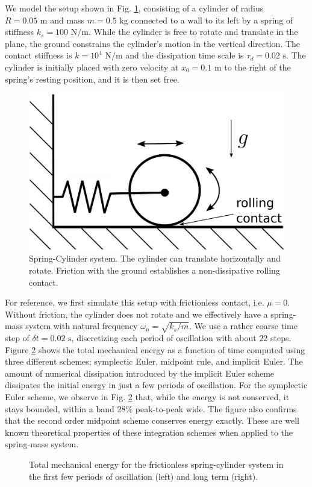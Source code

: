 We model the setup shown in Fig. \ref{fig:spring_cylinder}, consisting of a
cylinder of radius $R=0.05\text{ m}$ and mass $m=0.5\text{ kg}$ connected to a
wall to its left by a spring of stiffness $k_s=100\text{ N}/\text{m}$. While the
cylinder is free to rotate and translate in the plane, the ground constrains the
cylinder's motion in the vertical direction. The contact stiffness is
$k=10^{4}\text{ N}/\text{m}$ and the dissipation time scale is
$\tau_d=0.02\text{ s}$. The cylinder is initially placed with zero velocity at
$x_0=0.1\text{ m}$ to the right of the spring's resting position, and it is then
set free.
\begin{figure}[!h]
	\centering
	\includegraphics[width=0.6\columnwidth]{figures/schematics/spring_mass.png}
	\caption{\label{fig:spring_cylinder} 
	Spring-Cylinder system. The cylinder can translate horizontally and rotate.
	Friction with the ground establishes a non-dissipative rolling contact.}
\end{figure}

For reference, we first simulate this setup with frictionless contact, i.e.
$\mu=0$. Without friction, the cylinder does not rotate and we effectively have
a spring-mass system with natural frequency $\omega_n=\sqrt{k_s/m}$. We use a
rather coarse time step of $\delta t=0.02\text{ s}$, discretizing each period of
oscillation with about $22$ steps. Figure
\ref{fig:frictionless_spring_cylinder_energy} shows the total mechanical energy
as a function of time computed using three different schemes; symplectic Euler,
midpoint rule, and implicit Euler. The amount of numerical dissipation
introduced by the implicit Euler scheme dissipates the initial energy in just a
few periods of oscillation. For the symplectic Euler scheme, we observe in Fig.
\ref{fig:frictionless_spring_cylinder_energy} that, while the energy is not
conserved, it stays bounded, within a band 28\% peak-to-peak wide. The figure
also confirms that the second order midpoint scheme conserves energy exactly.
These are well known theoretical properties of these integration schemes when
applied to the spring-mass system.
\begin{figure}[!h]
    \centering
    \caption{\label{fig:frictionless_spring_cylinder_energy} 
    Total mechanical energy for the frictionless spring-cylinder system in the
    first few periods of oscillation (left) and long term (right).}
\end{figure}

